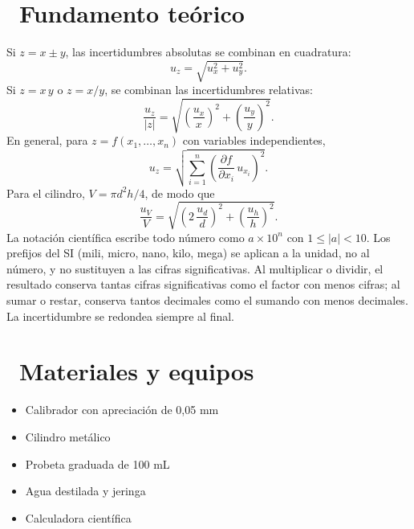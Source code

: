 \documentclass[11pt,a4paper]{article}
\newcommand{\iconotexto}[2]{\textcolor{cyanNeon}{\faIcon{#1}}~#2}
\begin{document}
\section{\iconotexto{book-open}{Fundamento teórico}}

Si $z = x \pm y$, las incertidumbres absolutas se combinan en cuadratura:
\[
  u_z = \sqrt{u_x^2 + u_y^2}.
\]
Si $z = x\,y$ o $z = x/y$, se combinan las incertidumbres relativas:
\[
  \frac{u_z}{|z|} = \sqrt{\left(\frac{u_x}{x}\right)^2
                        + \left(\frac{u_y}{y}\right)^2}.
\]
En general, para $z = f(x_1,\ldots,x_n)$ con variables independientes,
\[
  u_z = \sqrt{\sum_{i=1}^{n}
          \left(\frac{\partial f}{\partial x_i}\,u_{x_i}\right)^2}.
\]
Para el cilindro, $V = \pi d^2 h/4$, de modo que
\[
  \frac{u_V}{V} = \sqrt{\left(2\,\frac{u_d}{d}\right)^2
                        + \left(\frac{u_h}{h}\right)^2}.
\]
La notación científica escribe todo número como
$a \times 10^{n}$ con $1 \le |a| < 10$. Los prefijos del SI
(mili, micro, nano, kilo, mega) se aplican a la unidad, no al número, y
no sustituyen a las cifras significativas. Al multiplicar o dividir, el
resultado conserva tantas cifras significativas como el factor con menos
cifras; al sumar o restar, conserva tantos decimales como el sumando con
menos decimales. La incertidumbre se redondea siempre al final.

\begin{center}
\par{}
\end{center}

\section{\iconotexto{box-open}{Materiales y equipos}}

\begin{itemize}[leftmargin=1.4em,itemsep=2pt,topsep=3pt]
  \item Calibrador con apreciación de 0,05 mm
  \item Cilindro metálico
  \item Probeta graduada de 100 mL
  \item Agua destilada y jeringa
  \item Calculadora científica
\end{itemize}
\end{document}
